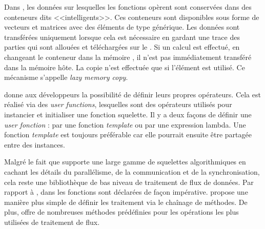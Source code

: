 Dans , les donn\'ees sur lesquelles les fonctions opèrent sont conserv\'ees dans des conteneurs dits <<intelligents>>. Ces conteneurs sont disponibles sous forme de vecteurs et matrices avec des \'el\'ements de type g\'en\'erique. Les donn\'ees sont transf\'er\'ees uniquement lorsque cela est n\'ecessaire en gardant une trace des parties qui sont allou\'ees et t\'el\'echarg\'ees sur le . Si un calcul est effectu\'e, en changeant le conteneur dans la m\'emoire , il n'est pas imm\'ediatement transf\'er\'e dans la m\'emoire h\^ote. La copie n'est effectu\'ee que si l'\'el\'ement est utilis\'e. Ce m\'ecanisme s'appelle \emph{lazy memory copy}.



 donne aux d\'eveloppeurs la possibilit\'e de d\'efinir leurs propres op\'erateurs. Cela est r\'ealis\'e via des \emph{user functions}, lesquelles sont des op\'erateurs utilis\'es pour instancier et initialiser une fonction squelette. Il y a deux fa\c {c}ons de d\'efinir une \emph{user fonction} : par une fonction \emph{template} ou par une expression lambda. Une fonction \emph{template} est toujours pr\'ef\'erable car elle pourrait ensuite \^etre partag\'ee entre des instances.


Malgr\'e le fait que  supporte une large gamme de squelettes algorithmiques en cachant les d\'etails du parall\'elisme, de la communication et de la synchronisation, cela reste une biblioth\`eque de bas niveau de traitement de flux de donn\'ees. Par rapport \`a , dans  les fonctions sont d\'eclar\'ees de fa\c {c}on imp\'erative.  propose une mani\`ere plus simple de d\'efinir les traitement via le cha\^inage de m\'ethodes. De plus,  offre de nombreuses m\'ethodes pr\'ed\'efinies pour les op\'erations les plus utilis\'ees de traitement de flux.
